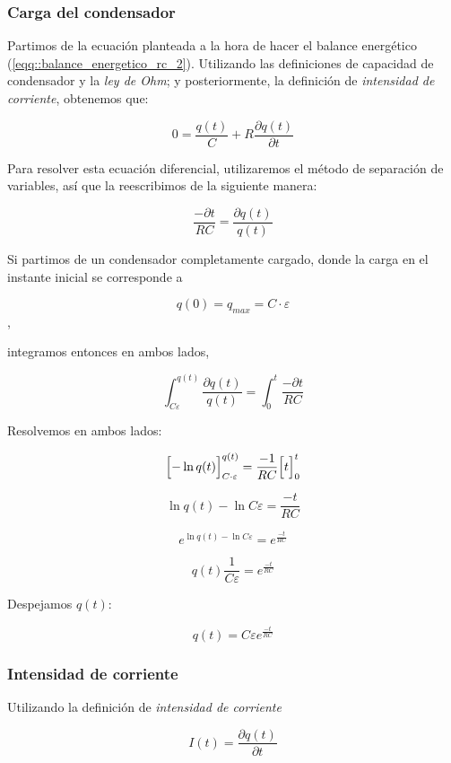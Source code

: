 \documentclass[../main.tex]{subfiles}
\begin{document}
\subsubsection{Carga del condensador}

\label{part::descarga_condensador_1}
Partimos de la ecuación planteada a la hora de hacer el balance energético (\ref{eqq::balance_energetico_rc_2}). Utilizando las definiciones de capacidad de condensador y la \textit{ley de Ohm}; y posteriormente, la definición de \textit{intensidad de corriente}, obtenemos que:

$$0 = \frac{q(t)}{C} + R\frac{\partial q(t)}{\partial t}$$

Para resolver esta ecuación diferencial, utilizaremos el método de separación de variables, así que la reescribimos de la siguiente manera:

$$\frac{-\partial t}{RC} = \frac{\partial q(t)}{q(t)}$$

Si partimos de un condensador completamente cargado, donde la carga en el instante inicial se corresponde a 

$$q(0) = q_{max} = C \cdot \varepsilon$$,

integramos entonces en ambos lados,

$$\int_{C\varepsilon}^{q(t)} \frac{\partial q(t)}{q(t)}  = \int_{0}^{t} \frac{-\partial t}{RC} $$

Resolvemos en ambos lados:

$$\Bigl[ -\ln{q(t)} \Bigr]_{C\cdot \varepsilon}^{q(t)} = \frac{-1}{RC}\Bigl[  t\Bigr]_0^{t}$$

$$\ln{q(t)} - \ln{C\varepsilon} = \frac{-t}{RC}$$

{\large
$$ e^{\ln{q(t)} - \ln{C\varepsilon}} = e^{\frac{-t}{RC}}$$ }

$$q(t)\frac{1}{C\varepsilon} = e^{\frac{-t}{RC}} $$

Despejamos $q(t)$:

\begin{equation}
    q(t) = C \varepsilon e^{\frac{-t}{RC}}
    \label{eqq::q(t)_descarga_rc}
\end{equation}


\subsubsection{Intensidad de corriente}
\label{part::descarga_condensador_2}
Utilizando la definición de \textit{intensidad de corriente}

$$I(t) = \frac{\partial q(t)}{\partial t}$$
\end{document}
